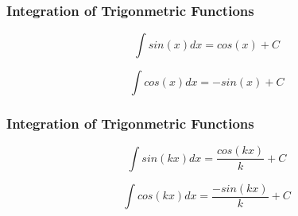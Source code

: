 \documentclass{beamer}
\begin{document}
\begin{frame}
\frametitle{Integration of Trigonmetric Functions}
\large

\[ \int sin(x) dx = cos(x) + C\]

\[ \int cos(x) dx = -sin(x) + C\]

\end{frame}
\begin{frame}
\frametitle{Integration of Trigonmetric Functions}
\large
\[ \int sin(kx) dx = \frac{cos(kx)}{k} + C\]

\[ \int cos(kx) dx = \frac{-sin(kx)}{k} + C\]
\end{frame}
\end{document}
